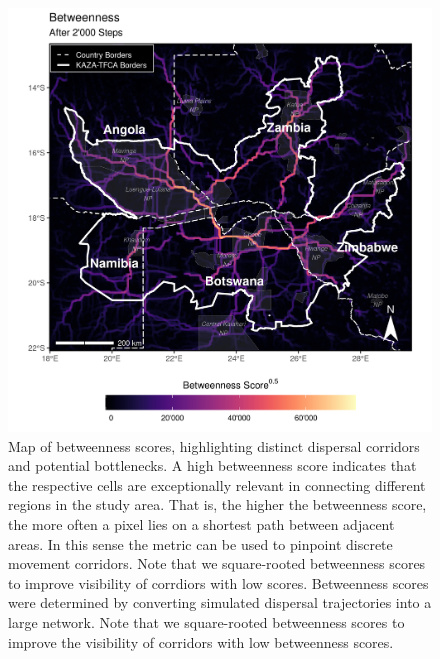\documentclass[abstract=on,10pt,a4paper,bibliography=totocnumbered]{article}
\begin{document}
\begin{figure}
  \includegraphics[width=\textwidth]{99_Betweenness.png}
  \caption{Map of betweenness scores, highlighting distinct dispersal corridors
  and potential bottlenecks. A high betweenness score indicates that the
  respective cells are exceptionally relevant in connecting different regions in
  the study area. That is, the higher the betweenness score, the more often a
  pixel lies on a shortest path between adjacent areas. In this sense the metric
  can be used to pinpoint discrete movement corridors. Note that we
  square-rooted betweenness scores to improve visibility of corrdiors with low
  scores. Betweenness scores were determined by converting simulated dispersal
  trajectories into a large network. Note that we square-rooted betweenness
  scores to improve the visibility of corridors with low betweenness scores.}
  \label{Betweenness}
\end{figure}
\end{document}
